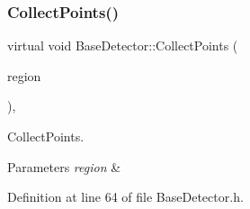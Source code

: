 \subsubsection{\texorpdfstring{Collect\+Points()}{CollectPoints()}}
{\footnotesize\ttfamily virtual void Base\+Detector\+::\+Collect\+Points (\begin{DoxyParamCaption}\item[{\mbox{\hyperlink{class_c_region}{C\+Region}} \&}]{region }\end{DoxyParamCaption})\hspace{0.3cm}{\ttfamily [inline]}, {\ttfamily [virtual]}}



Collect\+Points. 


\begin{DoxyParams}{Parameters}
{\em region} & \\
\hline
\end{DoxyParams}


Definition at line 64 of file Base\+Detector.\+h.


